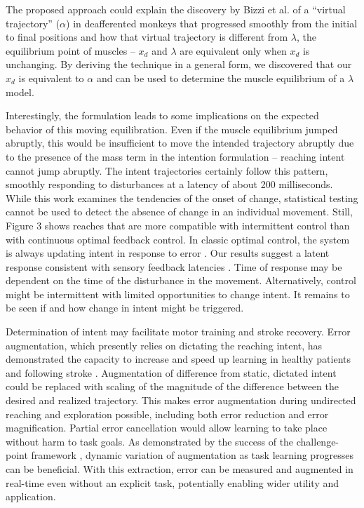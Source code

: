 The proposed approach could explain the discovery by Bizzi et al. \cite{bizzi1984posture} of a ``virtual trajectory'' ($\alpha$) in deafferented monkeys that progressed smoothly from the initial to final positions and how that virtual trajectory is different from $\lambda$, the equilibrium point of muscles -- $x_d$ and $\lambda$ are equivalent only when $x_d$ is unchanging.  By deriving the technique in a general form, we discovered that our $x_d$ is equivalent to $\alpha$ and can be used to determine the muscle equilibrium of a $\lambda$ model. 

Interestingly, the formulation leads to some implications on the expected behavior of this moving equilibration. Even if the muscle equilibrium jumped abruptly, this would be insufficient to move the intended trajectory abruptly due to the presence of the mass term in the intention formulation -- reaching intent cannot jump abruptly. The intent trajectories certainly follow this pattern, smoothly responding to disturbances at a latency of about 200 milliseconds. While this work examines the tendencies of the onset of change, statistical testing cannot be used to detect the absence of change in an individual movement. Still, Figure 3 shows reaches that are more compatible with intermittent control than with continuous optimal feedback control. In classic optimal control, the system is always updating intent in response to error \cite{todorov2002optimal}. Our results suggest a latent response consistent with sensory feedback latencies \cite{pruszynski2012optimal}. Time of response may be dependent on the time of the disturbance in the movement. Alternatively, control might be intermittent \cite{gawthrop2011intermittent} with limited opportunities to change intent. It remains to be seen if and how change in intent might be triggered. 

Determination of intent may facilitate motor training and stroke recovery. Error augmentation, which presently relies on dictating the reaching intent, has demonstrated the capacity to increase and speed up learning in healthy patients \cite{patton2004robot} and following stroke \cite{patton2006evaluation}. Augmentation of difference from static, dictated intent could be replaced with scaling of the magnitude of the difference between the desired and realized trajectory. This makes error augmentation during undirected reaching and exploration possible, including both error reduction and error magnification. Partial error cancellation would allow learning to take place without harm to task goals. As demonstrated by the success of the challenge-point framework \cite{guadagnoli2004challenge}, dynamic variation of augmentation as task learning progresses can be beneficial. With this extraction, error can be measured and augmented in real-time even without an explicit task, potentially enabling wider utility and application. 

